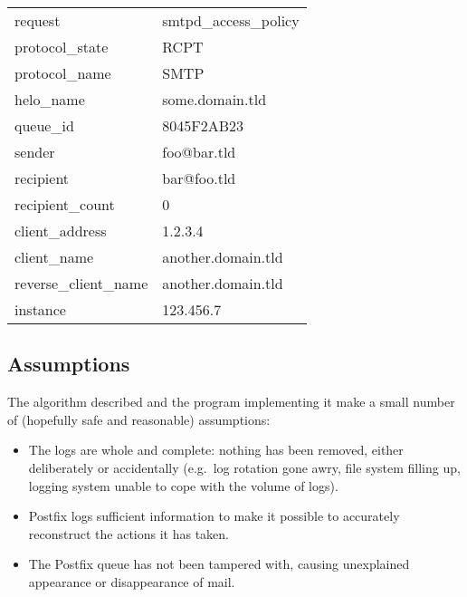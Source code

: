 \documentclass[a4paper,12pt,draft]{article}
\begin{document}
\begin{tabular}[]{ll}

    request                 & smtpd\_access\_policy     \\
    protocol\_state         & RCPT                      \\
    protocol\_name          & SMTP                      \\
    helo\_name              & some.domain.tld           \\
    queue\_id               & 8045F2AB23                \\
    sender                  & foo@bar.tld               \\
    recipient               & bar@foo.tld               \\
    recipient\_count        & 0                         \\
    client\_address         & 1.2.3.4                   \\
    client\_name            & another.domain.tld        \\
    reverse\_client\_name   & another.domain.tld        \\
    instance                & 123.456.7                 \\

\end{tabular}



\subsection{Assumptions}

The algorithm described and the program implementing it make a small number
of (hopefully safe and reasonable) assumptions:

\begin{itemize}

    \item The logs are whole and complete: nothing has been removed, either
        deliberately or accidentally (e.g.\ log rotation gone awry, file
        system filling up, logging system unable to cope with the volume of
        logs).

    \item Postfix logs sufficient information to make it possible to
        accurately reconstruct the actions it has taken.

    \item The Postfix queue has not been tampered with, causing unexplained
        appearance or disappearance of mail.

\end{itemize}
\end{document}
